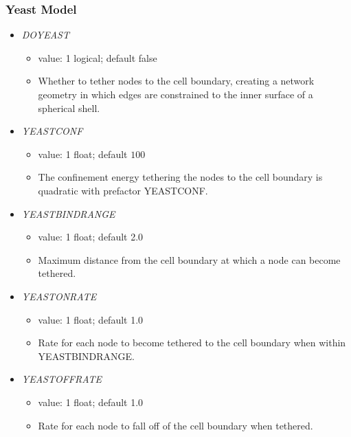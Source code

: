 \documentclass[12pt]{article}
\begin{document}
\subsubsection*{Yeast Model}
\begin{itemize}
%
\item {\it DOYEAST}
  \begin{itemize}
    \item  value: 1 logical; default false
    \item Whether to tether nodes to the cell boundary, creating a network geometry in which edges are constrained to the inner surface of a spherical shell.
  \end{itemize}
%
\item {\it YEASTCONF}
  \begin{itemize}
    \item  value: 1 float; default $100$
    \item The confinement energy tethering the nodes to the cell boundary is quadratic with prefactor YEASTCONF.
  \end{itemize}
%
\item {\it YEASTBINDRANGE}
  \begin{itemize}
    \item  value: 1 float; default 2.0
    \item Maximum distance from the cell boundary at which a node can become tethered.
  \end{itemize}
%
\item {\it YEASTONRATE}
  \begin{itemize}
    \item  value: 1 float; default 1.0
    \item Rate for each node to become tethered to the cell boundary when within YEASTBINDRANGE.
  \end{itemize}
%
\item {\it YEASTOFFRATE}
  \begin{itemize}
    \item  value: 1 float; default 1.0
    \item Rate for each node to fall off of the cell boundary when tethered.
  \end{itemize}
\end{itemize}
  
\end{document}
